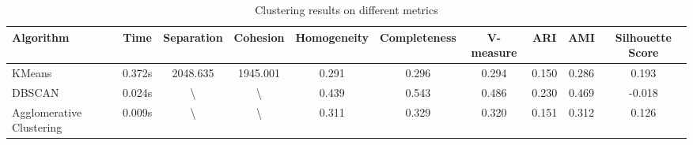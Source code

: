 \documentclass[12pt,a4paper]{article}
\begin{document}
\begin{table}[H]
\begin{adjustbox}{width=\textwidth}
    \centering
    \begin{tabular}{lccccccccc}
        \toprule
        \textbf{Algorithm} & \textbf{Time} & \textbf{Separation} & \textbf{Cohesion} & \textbf{Homogeneity} & \textbf{Completeness} & \textbf{V-measure} & \textbf{ARI} & \textbf{AMI} & \textbf{Silhouette Score} \\
        \midrule
        KMeans & 0.372s & 2048.635 & 1945.001 & 0.291 & 0.296 & 0.294 & 0.150 & 0.286 & 0.193 \\
        DBSCAN & 0.024s & \textbackslash & \textbackslash & 0.439 & 0.543 & 0.486 & 0.230 & 0.469 & -0.018 \\
        Agglomerative Clustering & 0.009s & \textbackslash & \textbackslash & 0.311 & 0.329 & 0.320 & 0.151 & 0.312 & 0.126 \\
        \bottomrule
    \end{tabular}
\end{adjustbox}
    \caption{Clustering results on different metrics}
    \label{tab:clustering_results}
\end{table}
\end{document}

